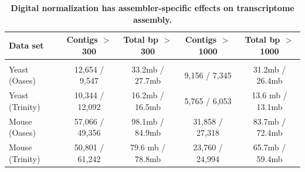 \documentclass[10pt]{article}
\begin{document}

\begin{table}[!ht]
\caption{
\bf{Digital normalization has assembler-specific effects on transcriptome
assembly.}}


\begin{tabular}{|l|c|c|c|c|}

Data set & Contigs $>$ 300 & Total bp $>$ 300 & Contigs $>$ 1000 & Total bp $>$ 1000 \\
\hline \\
Yeast (Oases) & 12,654 / 9,547 & 33.2mb / 27.7mb & 9,156 / 7,345 & 31.2mb / 26.4mb \\
Yeast (Trinity) & 10,344 / 12,092 & 16.2mb / 16.5mb & 5,765 / 6,053 & 13.6 mb / 13.1mb \\
Mouse (Oases) & 57,066 / 49,356 & 98.1mb / 84.9mb & 31,858 / 27,318 & 83.7mb / 72.4mb \\
Mouse (Trinity) & 50,801 / 61,242 & 79.6 mb / 78.8mb & 23,760 / 24,994 & 65.7mb / 59.4mb \\

\end{tabular}

\begin{flushleft}
\end{flushleft}
\label{tab:dntrans0}
\end{table}
\end{document}

